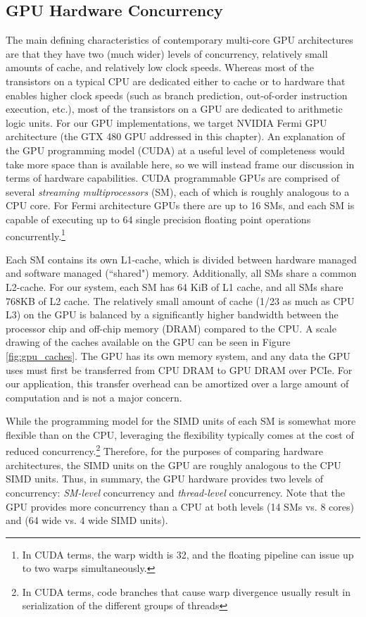 \subsection{GPU Hardware Concurrency} 
The main defining characteristics of contemporary multi-core GPU architectures
are that they have two (much wider) levels of concurrency, relatively small amounts of
 cache, and relatively low clock speeds.  Whereas most of the transistors on
a typical CPU are dedicated either to cache or to hardware that enables higher
clock speeds (such as branch prediction, out-of-order instruction execution, etc.),
most of the transistors on a GPU are dedicated to arithmetic logic units.
For our GPU implementations, we target NVIDIA Fermi GPU architecture (\eg the GTX 480
GPU addressed in this chapter).  An explanation of the GPU programming model (CUDA) at a useful level of completeness would take more space than is available here, so we will instead frame our discussion in terms of 
hardware capabilities. 
CUDA programmable GPUs are comprised of several
\emph{streaming multiprocessors} (SM), each of which is roughly analogous to a CPU core.
For Fermi architecture GPUs there are up to 16 SMs, and each SM is capable of executing up to 64 single precision 
floating point operations
concurrently.\footnote{In CUDA terms, the warp width is 32, and the floating pipeline can
issue up to two warps simultaneously.}

Each SM contains its own L1-cache, which is divided between hardware managed
and software managed (``shared") memory.  Additionally, all SMs share a common
L2-cache.  For our system, each SM has 64 KiB of L1 cache, and all SMs share
768KB of L2 cache. 
The relatively small amount
of cache (1/23 as much as CPU L3) on the GPU is balanced by a significantly
higher bandwidth between the processor chip and off-chip memory (DRAM) compared
to the CPU.  A scale drawing of the caches available on the GPU can be seen in Figure \ref{fig:gpu_caches}.
The GPU has its own memory system, and any data the GPU uses must first be
transferred from CPU DRAM to GPU DRAM over PCIe.  For our application,
this transfer overhead can be amortized over a large amount of computation and is
not a major concern.


While the programming model for
the SIMD units of each SM is somewhat more flexible than on the CPU,
leveraging the flexibility typically comes at the cost of reduced concurrency.\footnote{
In CUDA terms, code branches that cause warp divergence usually
result in serialization of the different groups of threads}  Therefore, for
the purposes of comparing hardware architectures, the SIMD units on the GPU are
roughly analogous to the CPU SIMD units. Thus, in summary, the GPU hardware 
provides two levels of concurrency: {\em SM-level}
concurrency and {\em thread-level} concurrency.  Note that the GPU provides more
concurrency than a CPU at both levels (14 SMs vs. 8 cores) and (64 wide vs. 4 wide SIMD
units).


